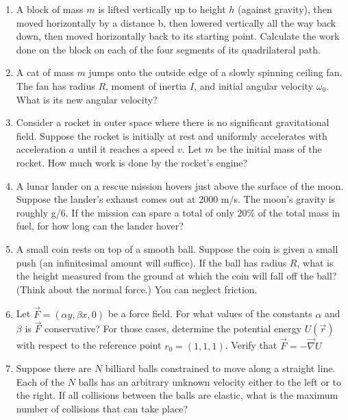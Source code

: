 \documentclass[fleqn]{article}
\begin{document}
  \begin{enumerate}
    \item A block of mass $m$ is lifted vertically up to height $h$ (against gravity), then moved horizontally by a distance b, then lowered vertically all the
    way back down, then moved horizontally back to its starting point. Calculate the work done on the block on each of the four segments of
    its quadrilateral path.


    \item A cat of mass $m$ jumps onto the outside edge of a slowly spinning ceiling fan. The fan has radius $R$, moment of inertia $I$, and initial
    angular velocity $\omega_0$. What is its new angular velocity?
    


    \item Consider a rocket in outer space where there is no significant gravitational field. Suppose the rocket is initially at rest and uniformly
    accelerates with acceleration $a$ until it reaches a speed $v$. Let $m$ be the initial mass of the rocket. How much work is done by the rocket’s
    engine?
    


    \item A lunar lander on a rescue mission hovers just above the surface of
    the moon. Suppose the lander’s exhaust comes out at 2000 m/s. The
    moon’s gravity is roughly g/6. If the mission can spare a total of only $20\%$ of the total mass in fuel, for how long can the lander hover?
    



    \item A small coin rests on top of a smooth ball. Suppose the coin is given a
    small push (an infinitesimal amount will suffice). If the ball has radius $R$, what is the height measured from the ground at which the coin will
    fall off the ball? (Think about the normal force.) You can neglect
    friction.



    \item  Let $\overrightarrow{F}= (\alpha y, \beta x, 0)$ be a force field. For what values of the constants
    $\alpha$ and $\beta$ is $\overrightarrow{F}$ conservative? For those cases, determine the potential energy $U(\overrightarrow{r})$
    with respect to the reference point $r_0=(1,1,1)$. Verify that $\overrightarrow{F}=-\overrightarrow{\nabla} U$



    \item Suppose there are $N$ billiard balls constrained to move along a straight
    line. Each of the $N$ balls has an arbitrary unknown velocity either to
    the left or to the right. If all collisions between the balls are elastic,
    what is the maximum number of collisions that can take place?
    



\end{enumerate}
\end{document}
